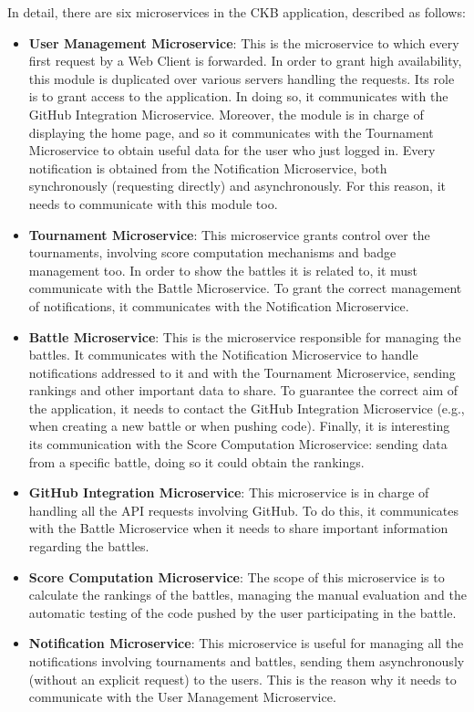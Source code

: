 In detail, there are six microservices in the CKB application, described as follows:

\begin{itemize}
    \item \textbf{User Management Microservice}: This is the microservice to which every first request by a Web Client is forwarded. In order to grant high availability, this module is duplicated over various servers handling the requests. Its role is to grant access to the application. In doing so, it communicates with the GitHub Integration Microservice. Moreover, the module is in charge of displaying the home page, and so it communicates with the Tournament Microservice to obtain useful data for the user who just logged in. Every notification is obtained from the Notification Microservice, both synchronously (requesting directly) and asynchronously. For this reason, it needs to communicate with this module too.
    
    \item \textbf{Tournament Microservice}: This microservice grants control over the tournaments, involving score computation mechanisms and badge management too. In order to show the battles it is related to, it must communicate with the Battle Microservice. To grant the correct management of notifications, it communicates with the Notification Microservice.
    
    \item \textbf{Battle Microservice}: This is the microservice responsible for managing the battles. It communicates with the Notification Microservice to handle notifications addressed to it and with the Tournament Microservice, sending rankings and other important data to share. To guarantee the correct aim of the application, it needs to contact the GitHub Integration Microservice (e.g., when creating a new battle or when pushing code). Finally, it is interesting its communication with the Score Computation Microservice: sending data from a specific battle, doing so it could obtain the rankings.
    
    \item \textbf{GitHub Integration Microservice}: This microservice is in charge of handling all the API requests involving GitHub. To do this, it communicates with the Battle Microservice when it needs to share important information regarding the battles.
    
    \item \textbf{Score Computation Microservice}: The scope of this microservice is to calculate the rankings of the battles, managing the manual evaluation and the automatic testing of the code pushed by the user participating in the battle.
    
    \item \textbf{Notification Microservice}: This microservice is useful for managing all the notifications involving tournaments and battles, sending them asynchronously (without an explicit request) to the users. This is the reason why it needs to communicate with the User Management Microservice.
\end{itemize}
